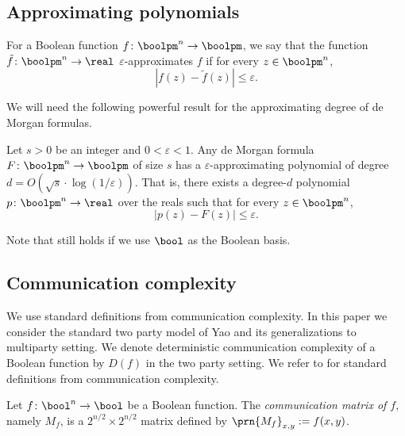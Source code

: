 %
%
%
%
%
    
    \subsection{Approximating polynomials}
    
    \begin{definition}
        For a Boolean function $f\colon\boolpm^n\to\boolpm$, we say that the function $\tilde{f}\colon\boolpm^n\to\real$ $\varepsilon$-approximates $f$ if for every $z\in\boolpm^n$,
		\[
			\left| f(z)-\tilde{f}(z)\right| \leq \varepsilon.
		\]
    \end{definition}
    
    We will need the following powerful result for the approximating degree of de Morgan formulas.
    
    \begin{theorem}\label{thm:approx-polynomial}
		Let $s>0$ be an integer and $0<\varepsilon<1$. Any de Morgan formula $F\colon\boolpm^n\to\boolpm$ of size $s$ has a $\varepsilon$-approximating polynomial of degree $d=O(\sqrt{s}\cdot\log(1/\varepsilon))$. That is, there exists a degree-$d$ polynomial $p\colon\boolpm^n\to\real$ over the reals such that for every $z\in\boolpm^n$,
		\[
			\left| p(z)-F(z)\right| \leq \varepsilon.
		\]
	\end{theorem}
	
	Note that  still holds if we use $\bool$ as the Boolean basis.
    
	\subsection{Communication complexity}
	
	We use standard definitions from communication complexity. In this paper we consider the standard two party model of Yao and its generalizations to multiparty setting. We denote deterministic communication complexity of a Boolean function by $D(f)$ in the two party setting. We refer to \citep{Kushilevitz-Nisan97} for 
	standard definitions from communication complexity.
	
%
%
	    
%
%
	
%
	
	\begin{definition}
	    Let $f\colon\bool^{n}\to\bool$ be a Boolean function. The \emph{communication matrix of $f$}, namely $M_f$, is a $2^{n/2}\times2^{n/2}$ matrix defined by $\prn{M_f}_{x,y}:=f(x,y)$.
	\end{definition}
	
